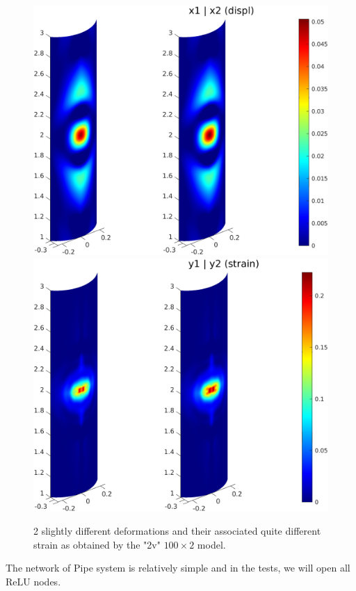 \documentclass[letterpaper]{article} %
\newcommand{\ReLU}{\mathrm{ReLU}}
\begin{document}
	\begin{figure}[t!]
\includegraphics[scale=0.5]{deform.png} \hspace{0.8cm}
\includegraphics[scale=0.5]{strain.png}
\caption{2 slightly different deformations and their associated quite different strain as obtained by the "2v" $100 \times 2$ model.}
\end{figure}	


	The network of Pipe system is relatively simple and in the tests, we will open all $\ReLU$ nodes.
\end{document}

